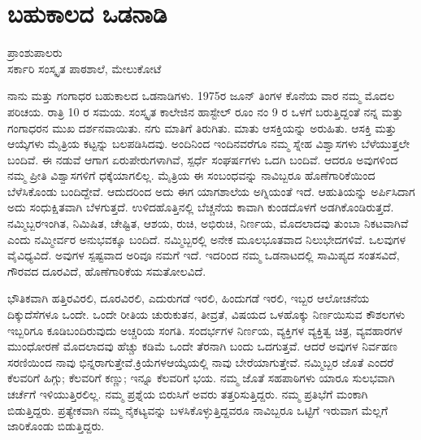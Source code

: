 {\fontsize{14}{16}\selectfont
\chapter{ಬಹುಕಾಲದ ಒಡನಾಡಿ}

\begin{center}
\smallskip
ಪ್ರಾಂಶುಪಾಲರು\\
ಸರ್ಕಾರಿ ಸಂಸ್ಕೃತ ಪಾಠಶಾಲೆ, ಮೇಲುಕೋಟೆ
\addrule
\end{center}

ನಾನು ಮತ್ತು ಗಂಗಾಧರ ಬಹುಕಾಲದ ಒಡನಾಡಿಗಳು. 1975ರ ಜೂನ್ ತಿಂಗಳ ಕೊನೆಯ ವಾರ ನಮ್ಮ ಮೊದಲ ಪರಿಚಯ. ರಾತ್ರಿ 10 ರ ಸಮಯ. ಸಂಸ್ಕೃತ ಕಾಲೇಜಿನ ಹಾಸ್ಟೇಲ್ ರೂಂ ನಂ \enginline{-} 9 ರ ಒಳಗೆ ಬರುತ್ತಿದ್ದಂತೆ ನನ್ನ ಮತ್ತು ಗಂಗಾಧರನ ಮುಖ ದರ್ಶನವಾಯಿತು. ನಗು ಮಾತಿಗೆ ತಿರುಗಿತು. ಮಾತು ಆಸಕ್ತಿಯನ್ನು ಅರುಹಿತು. ಆಸಕ್ತಿ ಮತ್ತು ಆಯ್ಕೆಗಳು ಮೈತ್ರಿಯ ಕಟ್ಟನ್ನು ಬಲಪಡಿಸಿದವು. ಅಂದಿನಿಂದ ಇಂದಿನ\-ವರೆಗೂ ನಮ್ಮ ಸ್ನೇಹ ವಿಶ್ವಾಸಗಳು ಬೆಳೆಯುತ್ತಲೇ ಬಂದಿವೆ. ಈ ನಡುವೆ ಆಗಾಗ ಏರುಪೇರುಗಳಾಗಿವೆ, ಸ್ಪರ್ಧೆ ಸಂಘರ್ಷಗಳು ಒದಗಿ ಬಂದಿವೆ. ಆದರೂ ಅವುಗಳಿಂದ ನಮ್ಮ ಪ್ರೀತಿ ವಿಶ್ವಾಸಗಳಿಗೆ ಧಕ್ಕೆಯಾಗಲಿಲ್ಲ. ಮೈತ್ರಿಯ ಈ ಸಂಬಂಧವನ್ನು ನಾವಿಬ್ಬರೂ ಹೊಣೆಗಾರಿಕೆಯಿಂದ ಬೆಳೆಸಿಕೊಂಡು ಬಂದಿದ್ದೇವೆ. ಆದುದರಿಂದ ಅದು ಈಗ ಯಾಗಶಾಲೆಯ ಅಗ್ನಿಯಂತೆ ಇದೆ. ಆಹುತಿಯನ್ನು ಅರ್ಪಿಸಿದಾಗ ಅದು ಸಂಧುಕ್ಷಿತವಾಗಿ ಬೆಳಗುತ್ತದೆ. ಉಳಿದ\break ಹೊತ್ತಿನಲ್ಲಿ ಬೆಚ್ಚನೆಯ ಕಾವಾಗಿ ಕುಂಡದೊಳಗೆ ಅಡಗಿ\-ಕೊಂಡಿರುತ್ತದೆ. ನಮ್ಮಿಬ್ಬರ\break ಇಂಗಿತ, ನಿಮಿಷಿತ, ಚೇಷ್ಟಿತ, ಆಶಯ, ರುಚಿ, ಅಭಿರುಚಿ, ನಿರ್ಣಯ, \hbox{ಮೊದಲಾದವು} ತುಂಬಾ ನಿಕಟವಾಗಿವೆ ಎಂದು ನಮ್ಮೀರ್ವರ   \hbox{ಅನುಭವಕ್ಕೂ} ಬಂದಿದೆ. ನಮ್ಮಿಬ್ಬರಲ್ಲಿ ಅನೇಕ ಮೂಲಭೂತವಾದ ನಿಲು\enginline{-}ಭೇದಗಳಿವೆ. ಒಲವುಗಳ ವೈವಿಧ್ಯವಿದೆ. ಅವುಗಳ ಸ್ಪಷ್ಟವಾದ ಅರಿವೂ ನಮಗೆ ಇದೆ. ಇದರಿಂದ ನಮ್ಮ ಒಡನಾಟದಲ್ಲಿ  ಸಾಮಿಪ್ಯದ ಸಂತಸವಿದೆ, ಗೌರವದ ದೂರವಿದೆ, ಹೊಣೆಗಾರಿಕೆಯ ಸಮತೋಲ\-ವಿದೆ. 

ಭೌತಿಕವಾಗಿ ಹತ್ತಿರವಿರಲಿ, ದೂರವಿರಲಿ, ಎದುರುಗಡೆ ಇರಲಿ, ಹಿಂದುಗಡೆ ಇರಲಿ, ಇಬ್ಬರ ಆಲೋಚನೆಯ ದಿಕ್ಕು\enginline{-}ದೆಸೆಗಳೂ ಒಂದೇ. ಒಂದೇ ರೀತಿಯ ಚುರುಕುತನ, ತೀವ್ರತೆ, ವಿಷಯದ ಒಳಹೊಕ್ಕು ನಿರ್ಣಯಿಸುವ ಕೌಶಲಗಳು ಇಬ್ಬರಿಗೂ ಕೂಡಿ\-ಬಂದಿರುವುದು  ಅಚ್ಚರಿಯ ಸಂಗತಿ. ಸಂದರ್ಭಗಳ ನಿರ್ಣಯ, ವ್ಯಕ್ತಿಗಳ ವ್ಯಕ್ತಿತ್ವ \hbox{ಚಿತ್ರ,} ವ್ಯವಹಾರಗಳ ಮುಂಧೋರಣೆ ಮೊದಲಾದವು  ಹೆಚ್ಚು ಕಡಿಮೆ  ಒಂದೇ ತೆರನಾಗಿ ಬಂದು ಒದಗುತ್ತವೆ.  ಆದರೆ ಅವುಗಳ ನಿರ್ವಹಣ ಸರಣಿಯಿಂದ  ನಾವು ಭಿನ್ನರಾಗುತ್ತೇವೆ.\hbox{ಕ್ರಿಯೆಗಳ}ಆಯ್ಕೆಯಲ್ಲಿ ನಾವು ಬೇರೆಯಾಗುತ್ತೇವೆ. ನಮ್ಮಿಬ್ಬರ ಜೊತೆ ಎಂದರೆ ಕೆಲವರಿಗೆ ಹಿಗ್ಗು; ಕೆಲವರಿಗೆ ಕಣ್ಣು; ಇನ್ನೂ ಕೆಲವರಿಗೆ  ಭಯ. ನಮ್ಮ ಜೊತೆ ಸಹಪಾಠಿಗಳು ಯಾರೂ ಸುಲಭವಾಗಿ ಚರ್ಚೆಗೆ ಇಳಿಯುತ್ತಿರಲಿಲ್ಲ.  ನಮ್ಮ ಪ್ರಶ್ನೆಯ \hbox{ಬಿರುಸಿಗೆ} ಅವರು ತತ್ತರಿ\-ಸುತ್ತಿದ್ದರು. ನಮ್ಮ ಪ್ರತಿಭೆಗೆ ಮಂಕಾಗಿ ಬಿಡುತ್ತಿದ್ದರು. ಪ್ರತ್ಯೇಕವಾಗಿ ನಮ್ಮ ನೈಕಟ್ಯ\-ವನ್ನು ಬಳಸಿಕೊಳ್ಳುತ್ತಿದ್ದವರೂ ನಾವಿಬ್ಬರೂ ಒಟ್ಟಿಗೆ ಇರುವಾಗ \hbox{ಮೆಲ್ಲಗೆ} \hbox{ಜಾರಿಕೊಂಡು} ಬಿಡುತ್ತಿದ್ದರು. 

}
